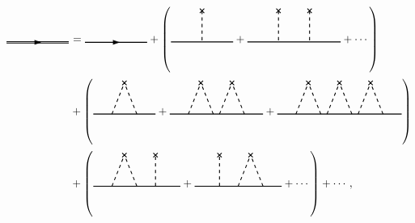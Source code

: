 \documentclass[aps,prx,superscriptaddress,onecolumn,preprintnumbers,nofootinbib,longbibliography]{revtex4-1}
\def\arrow{\tikz[scale=0.1,baseline=.1ex]{
	\draw[fill=black,rotate=-90] (-0.7,0)--(0,2)--(0.7,0);}
	}
\def\cross{\tikz[scale=0.1,baseline=.1ex]{
	\draw[thick,rotate=45] (-1,0)--(1,0);
	\draw[thick,rotate=45] (0,-1)--(0,1);}
	}
\begin{document}
		\begin{align*}
			\begin{tikzpicture}[baseline]
				\draw[double,thick] (0,0)-- (2,0);
				\node at (1,0) {\arrow};
			\end{tikzpicture}
			&=
			\begin{tikzpicture}[baseline]
				\draw[thick] (0,0)-- (2,0);
				\node at (1,0) {\arrow};
			\end{tikzpicture}
			+
			\left(
			\begin{tikzpicture}
				\draw[thick] (0,0)--(2,0);
				\draw[thick,dashed] (1,1)--(1,0);
				\node at (1,1) {\cross};
			\end{tikzpicture}
			+
			\begin{tikzpicture}
				\draw[thick] (0,0)--(3,0);
				\draw[thick,dashed] (1,1)--(1,0);
				\draw[thick,dashed] (2,1)--(2,0);
				\node at (1,1) {\cross};
				\node at (2,1) {\cross};
			\end{tikzpicture}
			+\cdots\right)\\
			&+
			\left(
			\begin{tikzpicture}
				\draw[thick] (0,0)--(2,0);
				\draw[thick,dashed] (0.6,0)--(1,1);
				\draw[thick,dashed] (1.4,0)--(1,1);
				\node at (1,1) {\cross};
			\end{tikzpicture}
			+
			\begin{tikzpicture}
				\draw[thick] (0,0)--(3,0);
				\draw[thick,dashed] (0.6,0)--(1,1);
				\draw[thick,dashed] (1.4,0)--(1,1);
				\draw[thick,dashed] (1.6,0)--(2,1);
				\draw[thick,dashed] (2.4,0)--(2,1);
				\node at (1,1) {\cross};
				\node at (2,1) {\cross};
			\end{tikzpicture}
			+
			\begin{tikzpicture}
				\draw[thick] (0,0)--(4,0);
				\draw[thick,dashed] (0.6,0)--(1,1);
				\draw[thick,dashed] (1.4,0)--(1,1);
				\draw[thick,dashed] (1.6,0)--(2,1);
				\draw[thick,dashed] (2.4,0)--(2,1);
				\draw[thick,dashed] (2.6,0)--(3,1);
				\draw[thick,dashed] (3.4,0)--(3,1);
				\node at (1,1) {\cross};
				\node at (2,1) {\cross};
				\node at (3,1) {\cross};
			\end{tikzpicture}
			\right)\\
			&+\left(\begin{tikzpicture}
				\draw[thick] (0,0)--(2.8,0);
				\draw[thick,dashed] (0.6,0)--(1,1);
				\draw[thick,dashed] (1.4,0)--(1,1);
				\draw[thick,dashed] (2,0)--(2,1);
				\node at (1,1) {\cross};
				\node at (2,1) {\cross};
			\end{tikzpicture}
			+
			\begin{tikzpicture}
				\draw[thick] (0.2,0)--(3,0);
				\draw[thick,dashed] (1.6,0)--(2,1);
				\draw[thick,dashed] (2.4,0)--(2,1);
				\draw[thick,dashed] (1,0)--(1,1);
				\node at (1,1) {\cross};
				\node at (2,1) {\cross};
			\end{tikzpicture}+\cdots\right)+\cdots,
		\end{align*}
\end{document}
